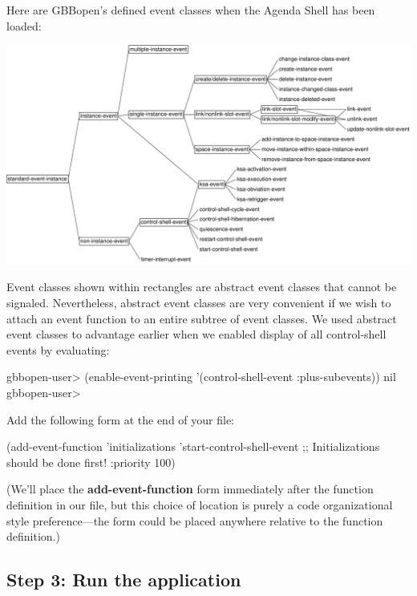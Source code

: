 \documentclass[10pt,twoside,english,pdftex]{article}
\begin{document}
Here are GBBopen's defined event classes when the Agenda Shell has
been loaded:
%
\T\begin{ifhtml}
\T\end{ifhtml}
\W\begin{iftex} 
\begin{center}
\includegraphics[scale=0.85]{agenda-shell-events}
\end{center}
\W\end{iftex}
%
Event classes shown within rectangles are abstract event classes that cannot
be signaled.  Nevertheless, abstract event classes are very convenient if we
wish to attach an event function to an entire subtree of event classes.  We
used abstract event classes to advantage earlier when we enabled display of
all control-shell events by evaluating:
%
\W\supp
\begin{example}
\textcolor{darkergray}{%
  gbbopen-user> (enable-event-printing '(control-shell-event :plus-subevents))
  nil
  gbbopen-user>}
\end{example}

Add the following form at the end of your  file:
%
\W\supp
\begin{example}
  (add-event-function 'initializations 'start-control-shell-event
                      ;; Initializations should be done first!
                      :priority 100)
\end{example}
%
(We'll place the \textbf{add-event-function} form immediately after the
 function definition in our file, but this choice of
location is purely a code organizational style preference---the form could be
placed anywhere relative to the function definition.)

\subsection*{Step 3: Run the application}
\end{document}
